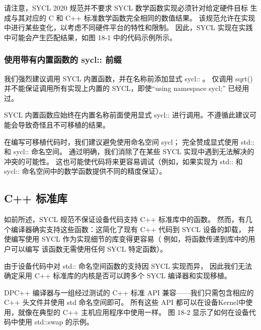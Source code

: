 请注意，SYCL 2020 规范并不要求 SYCL 数学函数实现必须针对给定硬件目标
生成与其对应的 C 和 C++ 标准数学函数完全相同的数值结果。 
该规范允许在实现中进行某些变化，以考虑不同硬件平台的特性和限制。 
因此，SYCL 实现在实践中可能会产生匹配结果，如图 18-1 中的代码示例所示。

\subsubsection{使用带有内置函数的 sycl:: 前缀}
我们强烈建议调用 SYCL 内置函数，并在名称前添加显式 sycl:: 。 
仅调用 sqrt() 并不能保证调用所有实现上内置的 SYCL，即使“using namespace sycl;” 已经用过。

\begin{remark}
	SYCL 内置函数应始终在内置名称前面使用显式 sycl:: 进行调用。不遵循此建议可能会导致奇怪且不可移植的结果。
\end{remark}

在编写可移植代码时，我们建议避免使用命名空间 sycl； 完全赞成显式使用 std:: 和 sycl:: 命名空间。 
通过明确，我们消除了在某些 SYCL 实现中遇到无法解决的冲突的可能性。 
这也可能使代码将来更容易调试（例如，如果实现为 std:: 和 sycl:: 命名空间中的数学函数提供不同的精度保证）。

\subsection{C++ 标准库}
如前所述，SYCL 规范不保证设备代码支持 C++ 标准库中的函数。 
然而，有几个编译器确实支持这些函数：这简化了现有 C++ 代码到 SYCL 设备的卸载，
并使编写使用 SYCL 作为实现细节的库变得更容易（
例如，将函数传递到库中的用户可以编写 该函数无需使用任何 SYCL 特定函数）。

\begin{remark}
	由于设备代码中对 std:: 命名空间函数的支持因 SYCL 实现而异，
	因此我们无法确定采用 C++ 标准库的内核是否可以跨多个 SYCL 编译器和实现移植。
\end{remark}

DPC++ 编译器与一组经过测试的 C++ 标准 API 兼容——我们只需包含相应的 C++ 头文件并使用 std 命名空间即可。 
所有这些 API 都可以在设备Kernel中使用，就像在典型的 C++ 主机应用程序中使用一样。 
图 18-2 显示了如何在设备代码中使用 std::swap 的示例。

